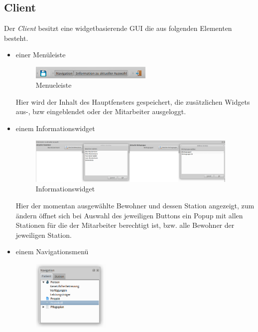 \subsection{\EBP Client}
Der \EBP \textit{Client} besitzt eine widgetbasierende GUI die aus folgenden Elementen besteht.
\begin{itemize}
	\item einer Menüleiste
	\begin{figure}[h]
		\begin{center}
			\includegraphics[keepaspectratio=true, width=0.55\textwidth]{pics/client_header.png}
			\caption{Menueleiste}
		\end{center}
	\end{figure}
	\FloatBarrier
	\noindent
	Hier wird der Inhalt des Hauptfensters gespeichert, die zusätzlichen Widgets aus-, bzw eingeblendet oder der Mitarbeiter ausgeloggt.
	\item einem Informationswidget
	\begin{figure}[h]
		\begin{center}
			\includegraphics[keepaspectratio=true, width=0.95\textwidth]{pics/client_info.png}
			\caption{Informationswidget}
		\end{center}
	\end{figure}
	\FloatBarrier
	\noindent
	Hier der momentan ausgewählte Bewohner und dessen Station angezeigt, zum ändern öffnet sich bei Auswahl des jeweiligen Buttons ein Popup mit allen Stationen für die der Mitarbeiter berechtigt ist, bzw. alle Bewohner der jeweiligen Station.
	\newpage
	\item einem Navigationsmenü
	\begin{figure}[h]
		\begin{center}
			\includegraphics[keepaspectratio=true, width=0.35\textwidth]{pics/client_navi.png}

\end{center}
\end{figure}
\end{itemize}

